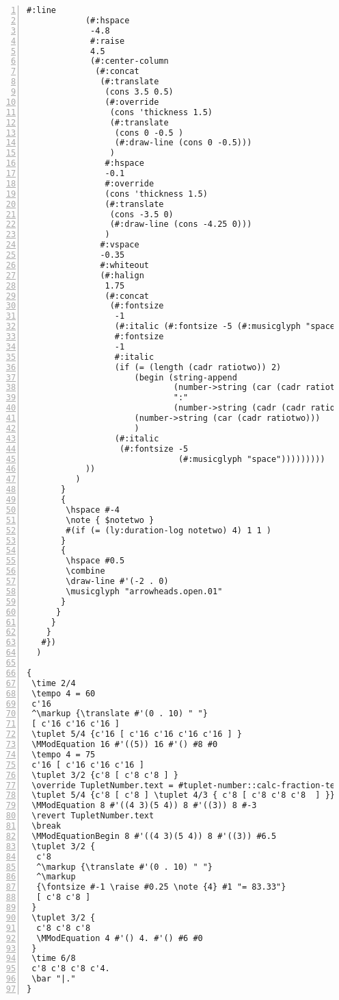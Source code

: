 \begin{Verbatim}[numbers=left,xleftmargin=5mm]
            #:line
            (#:hspace
             -4.8
             #:raise
             4.5
             (#:center-column
              (#:concat
               (#:translate
                (cons 3.5 0.5)
                (#:override
                 (cons 'thickness 1.5)
                 (#:translate
                  (cons 0 -0.5 )
                  (#:draw-line (cons 0 -0.5)))
                 )
                #:hspace
                -0.1
                #:override
                (cons 'thickness 1.5)
                (#:translate
                 (cons -3.5 0)
                 (#:draw-line (cons -4.25 0)))
                )
               #:vspace
               -0.35
               #:whiteout
               (#:halign
                1.75
                (#:concat
                 (#:fontsize
                  -1
                  (#:italic (#:fontsize -5 (#:musicglyph "space")))
                  #:fontsize
                  -1
                  #:italic
                  (if (= (length (cadr ratiotwo)) 2)
                      (begin (string-append
                              (number->string (car (cadr ratiotwo)))
                              ":"
                              (number->string (cadr (cadr ratiotwo)))))
                      (number->string (car (cadr ratiotwo)))
                      )
                  (#:italic
                   (#:fontsize -5
                               (#:musicglyph "space")))))))))
            ))
          )
       }
       {
        \hspace #-4
        \note { $notetwo }
        #(if (= (ly:duration-log notetwo) 4) 1 1 )
       }
       {
        \hspace #0.5
        \combine
        \draw-line #'(-2 . 0)
        \musicglyph "arrowheads.open.01"
       }
      }
     }
    }
   #})
  )

{
 \time 2/4
 \tempo 4 = 60
 c'16
 ^\markup {\translate #'(0 . 10) " "}
 [ c'16 c'16 c'16 ]
 \tuplet 5/4 {c'16 [ c'16 c'16 c'16 c'16 ] }
 \MModEquation 16 #'((5)) 16 #'() #8 #0
 \tempo 4 = 75
 c'16 [ c'16 c'16 c'16 ]
 \tuplet 3/2 {c'8 [ c'8 c'8 ] }
 \override TupletNumber.text = #tuplet-number::calc-fraction-text
 \tuplet 5/4 {c'8 [ c'8 ] \tuplet 4/3 { c'8 [ c'8 c'8 c'8  ] }}
 \MModEquation 8 #'((4 3)(5 4)) 8 #'((3)) 8 #-3
 \revert TupletNumber.text
 \break
 \MModEquationBegin 8 #'((4 3)(5 4)) 8 #'((3)) #6.5
 \tuplet 3/2 {
  c'8
  ^\markup {\translate #'(0 . 10) " "}
  ^\markup
  {\fontsize #-1 \raise #0.25 \note {4} #1 "= 83.33"}
  [ c'8 c'8 ]
 }
 \tuplet 3/2 {
  c'8 c'8 c'8
  \MModEquation 4 #'() 4. #'() #6 #0
 }
 \time 6/8
 c'8 c'8 c'8 c'4.
 \bar "|."
}
\end{Verbatim}


